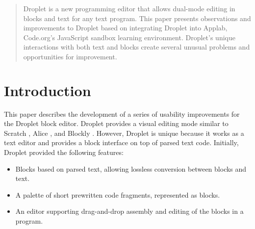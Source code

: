 \documentclass[conference]{IEEEtran}
\begin{document}
\begin{abstract}
Droplet is a new programming editor that allows dual-mode editing in blocks and text for any text program. This paper presents observations and improvements to Droplet based on integrating Droplet into Applab, Code.org's JavaScript sandbox learning environment. Droplet's unique interactions with both text and blocks create several unusual problems and opportunities for improvement.

\end{abstract}





%
\IEEEpeerreviewmaketitle

\section{Introduction}
This paper describes the development of a series of usability improvements for the Droplet block editor. Droplet provides a visual editing mode similar to Scratch \cite{Scratch}, Alice \cite{Alice}, and Blockly \cite{Blockly}. However, Droplet is unique because it works as a text editor and provides a block interface on top of parsed text code. Initially, Droplet provided the following features:

\begin{itemize}
  \item Blocks based on parsed text, allowing lossless conversion between blocks and text.
  \item A palette of short prewritten code fragments, represented as blocks.
  \item An editor supporting drag-and-drop assembly and editing of the blocks in a program.
\end{itemize}
\end{document}
